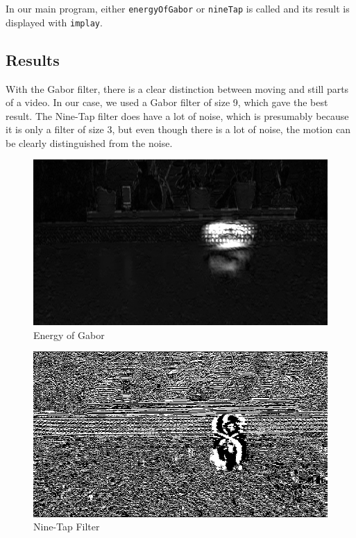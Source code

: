 \documentclass{article}
\begin{document}
  In our main program, either \texttt{energyOfGabor} or \texttt{nineTap} is called and its result is displayed with \texttt{implay}.

  \subsection{Results}

  With the Gabor filter, there is a clear distinction between moving and still parts of a video. In our case, we used a Gabor filter of size 9, which gave the best result. The Nine-Tap filter does have a lot of noise, which is presumably because it is only a filter of size 3, but even though there is a lot of noise, the motion can be clearly distinguished from the noise.

  \begin{figure}[!ht]
    \caption{Energy of Gabor}
    \centering
    \includegraphics[width=.8\textwidth]{gabor.png}
  \end{figure}

  \begin{figure}[!ht]
    \caption{Nine-Tap Filter}
    \centering
    \includegraphics[width=.8\textwidth]{nine-tap.png}
  \end{figure}

  \clearpage

  \appendix
\end{document}
